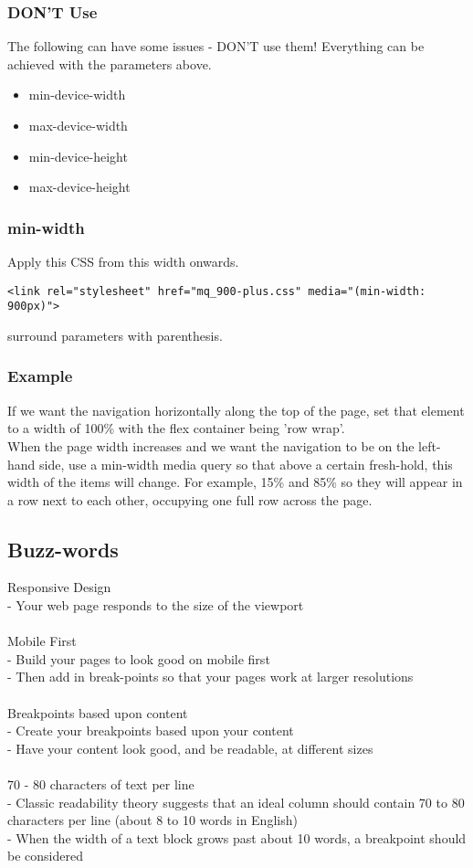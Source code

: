 \documentclass[]{article}
\newcommand{\<}{\guilsinglleft}
\renewcommand{\>}{\guilsinglright}
\begin{document}
\subsubsection{DON'T Use}
The following can have some issues - DON'T use them!  Everything can be achieved with the parameters above.
\begin{itemize}
	\item min-device-width
	\item max-device-width
	\item min-device-height
	\item max-device-height
\end{itemize}

\subsubsection{min-width}
Apply this CSS from this width onwards.
\begin{lstlisting}
<link rel="stylesheet" href="mq_900-plus.css" media="(min-width: 900px)">
\end{lstlisting}
surround parameters with parenthesis. 

\subsubsection{Example}
If we want the navigation horizontally along the top of the page, set that element to a width of 100\% with the flex container being 'row wrap'.  
\\
When the page width increases and we want the navigation to be on the left-hand side, use a min-width media query so that above a certain fresh-hold, this width of the items will change.  For example, 15\% and 85\% so they will appear in a row next to each other, occupying one full row across the page.

\subsection{Buzz-words}
Responsive Design\\
 - Your web page responds to the size of the viewport\\
 \\
Mobile First\\
 - Build your pages to look good on mobile first\\
 - Then add in break-points so that your pages work at larger resolutions\\
 \\
Breakpoints based upon content\\
 - Create your breakpoints based upon your content\\
 - Have your content look good, and be readable, at different sizes\\
 \\
70 - 80 characters of text per line\\
 - Classic readability theory suggests that an ideal column should contain 70 to 80 characters per line (about 8 to 10 words in English)\\
 - When the width of a text block grows past about 10 words, a breakpoint should be considered\\
 
\end{document}
